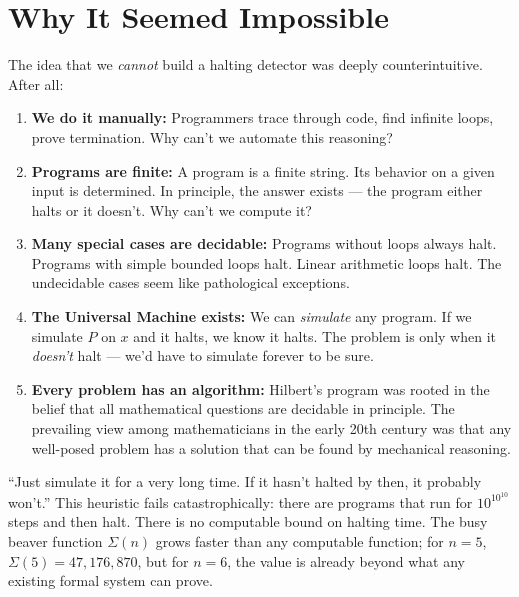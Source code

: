 \section{Why It Seemed Impossible}
\label{sec:halting:impossible}

The idea that we \emph{cannot} build a halting detector was deeply counterintuitive. After all:

\begin{enumerate}
\item \textbf{We do it manually:} Programmers trace through code, find infinite loops, prove termination. Why can't we automate this reasoning?

\item \textbf{Programs are finite:} A program is a finite string. Its behavior on a given input is determined. In principle, the answer exists — the program either halts or it doesn't. Why can't we compute it?

\item \textbf{Many special cases are decidable:} Programs without loops always halt. Programs with simple bounded loops halt. Linear arithmetic loops halt. The undecidable cases seem like pathological exceptions.

\item \textbf{The Universal Machine exists:} We can \emph{simulate} any program. If we simulate $P$ on $x$ and it halts, we know it halts. The problem is only when it \emph{doesn't} halt — we'd have to simulate forever to be sure.

\item \textbf{Every problem has an algorithm:} Hilbert's program was rooted in the belief that all mathematical questions are decidable in principle. The prevailing view among mathematicians in the early 20th century was that any well-posed problem has a solution that can be found by mechanical reasoning.
\end{enumerate}

``Just simulate it for a very long time. If it hasn't halted by then, it probably won't.'' This heuristic fails catastrophically: there are programs that run for $10^{10^{10}}$ steps and then halt. There is no computable bound on halting time. The busy beaver function $\Sigma(n)$ grows faster than any computable function; for $n=5$, $\Sigma(5) = 47,\!176,\!870$, but for $n=6$, the value is already beyond what any existing formal system can prove.

